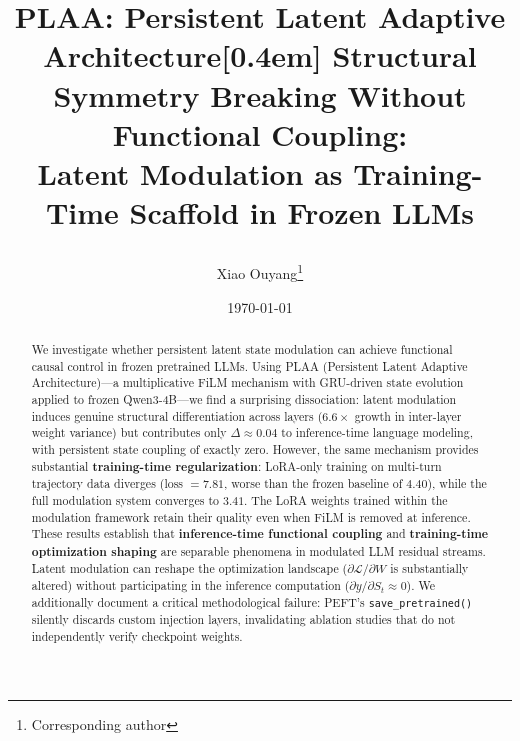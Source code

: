 \documentclass[11pt,a4paper]{article}
\title{

  \textbf{PLAA: Persistent Latent Adaptive Architecture}[0.4em] \large Structural Symmetry Breaking Without Functional Coupling:\\ \large Latent Modulation as Training-Time Scaffold in Frozen LLMs }  \author{ Xiao Ouyang\thanks{Corresponding author} }  \date{\today}
\begin{document}
  \maketitle \thispagestyle{empty}  \begin{abstract} We investigate whether persistent latent state modulation can achieve functional causal control in frozen pretrained LLMs. Using PLAA (Persistent Latent Adaptive Architecture)---a multiplicative FiLM mechanism with GRU-driven state evolution applied to frozen Qwen3-4B---we find a surprising dissociation: latent modulation induces genuine structural differentiation across layers ($6.6\times$ growth in inter-layer weight variance) but contributes only $\Delta \approx 0.04$ to inference-time language modeling, with persistent state coupling of exactly zero.  However, the same mechanism provides substantial \textbf{training-time regularization}: LoRA-only training on multi-turn trajectory data diverges (loss $= 7.81$, worse than the frozen baseline of $4.40$), while the full modulation system converges to $3.41$. The LoRA weights trained within the modulation framework retain their quality even when FiLM is removed at inference.  These results establish that \textbf{inference-time functional coupling} and \textbf{training-time optimization shaping} are separable phenomena in modulated LLM residual streams. Latent modulation can reshape the optimization landscape ($\partial \mathcal{L} / \partial W$ is substantially altered) without participating in the inference computation ($\partial y / \partial S_t \approx 0$). We additionally document a critical methodological failure: PEFT's \texttt{save\_pretrained()} silently discards custom injection layers, invalidating ablation studies that do not independently verify checkpoint weights. \end{abstract}  \newpage \setcounter{page}{1}  %
\end{document}
